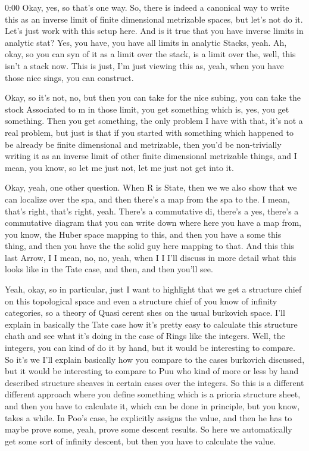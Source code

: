 \begin{unfinished}{0:00}
Okay, yes, so that's one way. So, there is indeed a canonical way to write this as an inverse limit of finite dimensional metrizable spaces, but let's not do it. Let's just work with this setup here. And is it true that you have inverse limits in analytic stat? Yes, you have, you have all limits in analytic Stacks, yeah. Ah, okay, so you can syn of it as a limit over the stack, is a limit over the, well, this isn't a stack now. This is just, I'm just viewing this as, yeah, when you have those nice sings, you can construct.

Okay, so it's not, no, but then you can take for the nice subing, you can take the stock Associated to m in those limit, you get something which is, yes, you get something. Then you get something, the only problem I have with that, it's not a real problem, but just is that if you started with something which happened to be already be finite dimensional and metrizable, then you'd be non-trivially writing it as an inverse limit of other finite dimensional metrizable things, and I mean, you know, so let me just not, let me just not get into it.

Okay, yeah, one other question. When R is State, then we we also show that we can localize over the spa, and then there's a map from the spa to the. I mean, that's right, that's right, yeah. There's a commutative di, there's a yes, there's a commutative diagram that you can write down where here you have a map from, you know, the Huber space mapping to this, and then you have a some this thing, and then you have the the solid guy here mapping to that. And this this last Arrow, I I mean, no, no, yeah, when I I I'll discuss in more detail what this looks like in the Tate case, and then, and then you'll see.

Yeah, okay, so in particular, just I want to highlight that we get a structure chief on this topological space and even a structure chief of you know of infinity categories, so a theory of Quasi cerent shes on the usual burkovich space. I'll explain in basically the Tate case how it's pretty easy to calculate this structure chath and see what it's doing in the case of Rings like the integers. Well, the integers, you can kind of do it by hand, but it would be interesting to compare. So it's we I'll explain basically how you compare to the cases burkovich discussed, but it would be interesting to compare to Puu who kind of more or less by hand described structure sheaves in certain cases over the integers. So this is a different different approach where you define something which is a prioria structure sheet, and then you have to calculate it, which can be done in principle, but you know, takes a while. In Poo's case, he explicitly assigns the value, and then he has to maybe prove some, yeah, prove some descent results. So here we automatically get some sort of infinity descent, but then you have to calculate the value.


\end{unfinished}
